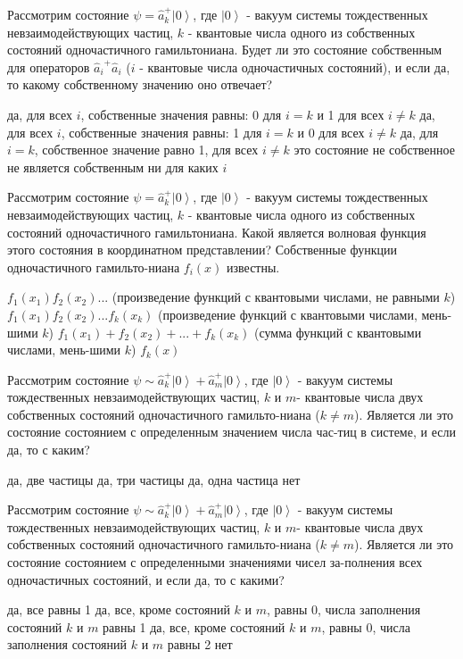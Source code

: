 \documentclass[11pt,a4paper]{exam}
\begin{document}
\begin{questions}
\question Рассмотрим состояние $\psi  = \hat a_k^ + \left| 0 \right\rangle $, где $\left| 0 \right\rangle $ - вакуум системы тождественных невзаимодействующих частиц, $k$ - квантовые числа одного из собственных состояний одночастичного гамильтониана. Будет ли это состояние собственным для операторов ${\hat a_i}^ + {\hat a_i}$ ($i$ - квантовые числа одночастичных состояний), и если да, то какому собственному значению оно отвечает?
\begin{choices}
\choice да, для всех $i$, собственные значения равны: 0 для $i = k$ и 1 для всех $i \ne k$
\choice да, для всех $i$, собственные значения равны: 1 для $i = k$ и 0 для всех $i \ne k$
\choice да, для $i = k$, собственное значение равно 1, для всех $i \ne k$ это состояние не собственное
\choice не является собственным ни для каких $i$
\end{choices}

\question Рассмотрим состояние $\psi  = \hat a_k^ + \left| 0 \right\rangle $, где $\left| 0 \right\rangle $ - вакуум системы тождественных невзаимодействующих частиц, $k$ - квантовые числа одного из собственных состояний одночастичного гамильтониана. Какой является волновая функция этого состояния в координатном представлении? Собственные функции одночастичного гамильто-ниана ${f_i}(x)$ известны.
\begin{choices}
\choice ${f_1}({x_1}){f_2}({x_2})...$ (произведение функций с квантовыми числами, не равными $k$)
\choice ${f_1}({x_1}){f_2}({x_2})...{f_k}({x_k})$ (произведение функций с квантовыми числами, мень-шими $k$)
\choice ${f_1}({x_1}) + {f_2}({x_2}) + ... + {f_k}({x_k})$ (сумма функций с квантовыми числами, мень-шими $k$)
\choice ${f_k}(x)$
\end{choices}

\question Рассмотрим состояние $\psi  \sim \hat a_k^ + \left| 0 \right\rangle  + \hat a_m^ + \left| 0 \right\rangle $, где $\left| 0 \right\rangle $ - вакуум системы тождественных невзаимодействующих частиц, $k$ и $m$- квантовые числа двух собственных состояний одночастичного гамильто-ниана ($k \ne m$). Является ли это состояние состоянием с определенным значением числа час-тиц в системе, и если да, то с каким?
\begin{choices}
\choice да, две частицы         
\choice да, три частицы
\choice да, одна частица        
\choice нет
\end{choices}

\question Рассмотрим состояние $\psi  \sim \hat a_k^ + \left| 0 \right\rangle  + \hat a_m^ + \left| 0 \right\rangle $, где $\left| 0 \right\rangle $ - вакуум системы тождественных невзаимодействующих частиц, $k$ и $m$- квантовые числа двух собственных состояний одночастичного гамильто-ниана ($k \ne m$). Является ли это состояние состоянием с определенными значениями чисел за-полнения всех одночастичных состояний, и если да, то с какими?
\begin{choices}
\choice да, все равны 1 
\choice да, все, кроме состояний $k$ и $m$, равны 0, числа заполнения состояний $k$ и $m$ равны 1
\choice да, все, кроме состояний $k$ и $m$, равны 0, числа заполнения состояний $k$ и $m$ равны 2
\choice нет
\end{choices}


\end{questions}
\end{document}
